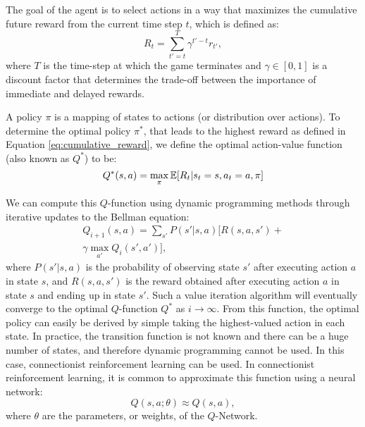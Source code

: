 The goal of the agent is to select actions in a way that maximizes the cumulative future reward from the current time step $t$, which is defined as:
\begin{equation}\label{eq:cumulative_reward}
	R_t = \sum_{t'=t}^{T} \gamma^{t'-t} r_{t'},
\end{equation}
where $T$ is the time-step at which the game terminates and $\gamma \in [0,1]$ is a discount factor that determines the trade-off between the importance of immediate and delayed rewards. 

A policy $\pi$ is a mapping of states to actions (or distribution over actions). To determine the optimal policy $\pi^*$, that leads to the highest reward as defined in Equation \eqref{eq:cumulative_reward}, we define the optimal action-value function (also known as $Q^*$) to be:
\begin{equation}\label{qfunction}
	Q^*(s, a) = \max_\pi \operatorname*{\mathbb{E}} [R_t \vert s_t=s, a_t=a, \pi]
\end{equation}

We can compute this $Q$-function using dynamic programming methods through iterative updates to the Bellman equation:
\begin{equation}
	\begin{array}{c}
		Q_{i+1}(s, a) = \sum_{s'} P(s' \vert s, a) [R(s,a,s') + \\
		\gamma \max_{a'} Q_i(s', a')],
	\end{array}
\end{equation}
where $P(s'\vert s,a)$ is the probability of observing state $s'$ after executing action $a$ in state $s$, and $R(s,a,s')$ is the reward obtained after executing action $a$ in state $s$ and ending up in state $s'$.
Such a value iteration algorithm will eventually converge to the optimal $Q$-function $Q^*$ as $i \rightarrow \infty$. From this function, the optimal policy can easily be derived by simple taking the highest-valued action in each state. In practice, the transition function is not known and there can be a huge number of states, and therefore dynamic programming cannot be used. In this case, connectionist reinforcement learning can be used. In connectionist reinforcement learning, it is common to approximate this function using a neural network:
\begin{equation}
	Q(s, a; \theta) \approx Q(s, a),
\end{equation}
where $\theta$ are the parameters, or weights, of the $Q$-Network.